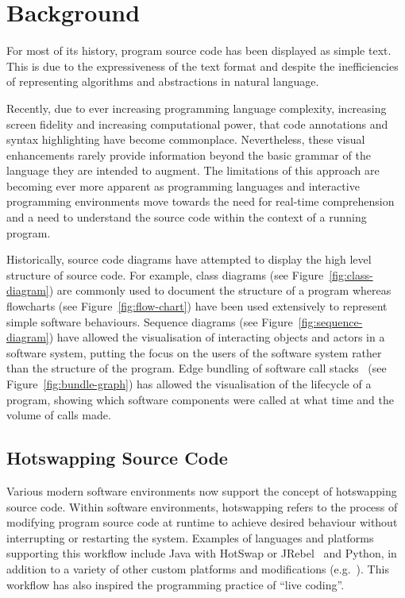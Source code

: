 

\section{Background}

For most of its history, program source code has been displayed as simple text. This is due to the expressiveness of the text format and despite the inefficiencies of representing algorithms and abstractions in natural language.

Recently, due to ever increasing programming language complexity, increasing screen fidelity and increasing computational power, that code annotations and syntax highlighting have become commonplace. Nevertheless, these visual enhancements rarely provide information beyond the basic grammar of the language they are intended to augment. The limitations of this approach are becoming ever more apparent as programming languages and interactive programming environments move towards the need for real-time comprehension and a need to understand the source code within the context of a running program.

Historically, source code diagrams have attempted to display the high level structure of source code. For example, class diagrams (see Figure~\ref{fig:class-diagram}) are commonly used to document the structure of a program whereas flowcharts (see Figure~\ref{fig:flow-chart}) have been used extensively to represent simple software behaviours. Sequence diagrams (see Figure~\ref{fig:sequence-diagram}) have allowed the visualisation of interacting objects and actors in a software system, putting the focus on the users of the software system rather than the structure of the program. Edge bundling of software call stacks~\cite{Zhou2013} (see Figure~\ref{fig:bundle-graph}) has allowed the visualisation of the lifecycle of a program, showing which software components were called at what time and the volume of calls made.

\subsection{Hotswapping Source Code}

Various modern software environments now support the concept of hotswapping source code. Within software environments, hotswapping refers to the process of modifying program source code at runtime to achieve desired behaviour without interrupting or restarting the system. Examples of languages and platforms supporting this workflow include Java with HotSwap or JRebel~\cite{ZeroTurnaround2014} and Python, in addition to a variety of other custom platforms and modifications (e.g.~\cite{Thomas2011}). This workflow has also inspired the programming practice of ``live coding''. 

